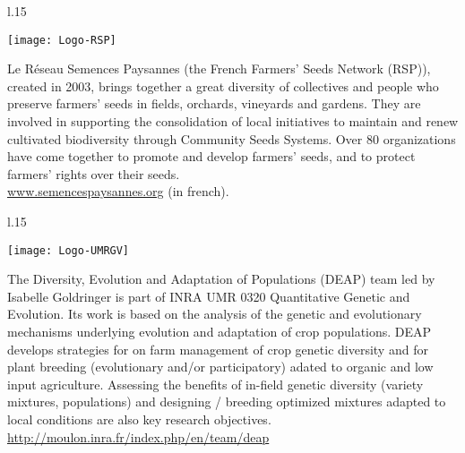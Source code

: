 \begin{wrapfigure}{l}{.15\textwidth}
\begin{center} \vspace{-20pt}
\texttt{[image: Logo-RSP]}
\end{center} \vspace{-20pt}
\end{wrapfigure}
\noindent
Le Réseau Semences Paysannes (the French Farmers' Seeds Network (RSP)), created in 2003, brings together a great diversity of collectives and people who preserve farmers' seeds in fields, orchards, vineyards and gardens. They are involved in supporting the consolidation of local initiatives to maintain and renew cultivated biodiversity through Community Seeds Systems. Over 80 organizations have come together to promote and develop farmers' seeds, and to protect farmers' rights over their seeds. \\
\url{www.semencespaysannes.org} (in french).


\vfill

\begin{wrapfigure}{l}{.15\textwidth}
\begin{center} \vspace{-20pt}
\texttt{[image: Logo-UMRGV]}
\end{center} \vspace{-20pt}
\end{wrapfigure}
\noindent
The Diversity, Evolution and Adaptation of Populations (DEAP) team led by Isabelle Goldringer is part of INRA UMR 0320 Quantitative Genetic and Evolution.
Its work is based on the analysis of the genetic and evolutionary mechanisms underlying evolution and adaptation of crop populations.
DEAP develops strategies for on farm management of crop genetic diversity and
for plant breeding (evolutionary and/or participatory) adated to organic and low input agriculture.
Assessing the benefits of in-field genetic diversity (variety mixtures, populations) and designing
/ breeding optimized mixtures adapted to local conditions are also key research objectives.\\
\url{http://moulon.inra.fr/index.php/en/team/deap}


\vfill


